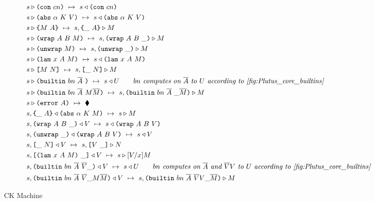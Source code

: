\documentclass[../main.tex]{subfiles}
\begin{document}
\begin{figure*}[t]

    \begin{align*}
        &s \triangleright \texttt{(} \texttt{con} ~ cn \texttt{)} ~\mapsto~ s \triangleleft \texttt{(} \texttt{con} ~ cn \texttt{)}\\
        &s \triangleright \texttt{(} \texttt{abs} ~ \alpha ~ K ~ V \texttt{)} ~\mapsto~ s \triangleleft \texttt{(} \texttt{abs} ~ \alpha ~ K ~ V \texttt{)}\\
        &s \triangleright \texttt{\{}M ~ A\texttt{\}} ~\mapsto~ s, \texttt{\{}\_ ~ A\texttt{\}} \triangleright M\\
        &s \triangleright \texttt{(} \texttt{wrap} ~ A ~ B ~ M \texttt{)} ~\mapsto~ s, \texttt{(} \texttt{wrap} ~ A ~ B ~ \_ \texttt{)} \triangleright M\\
        &s \triangleright \texttt{(} \texttt{unwrap} ~ M \texttt{)} ~\mapsto~ s, \texttt{(} \texttt{unwrap} ~ \_ \texttt{)}{} \triangleright M\\
        &s \triangleright \texttt{(} \texttt{lam} ~ x ~ A ~ M \texttt{)} ~\mapsto~ s \triangleleft \texttt{(} \texttt{lam} ~ x ~ A ~ M \texttt{)}\\
        &s \triangleright \texttt{[} M ~ N \texttt{]} ~\mapsto~ s, \texttt{[} \_ ~ N \texttt{]} \triangleright M\\
        &s \triangleright \texttt{(} \texttt{builtin} ~ bn ~ \overline{A} ~  \texttt{)} ~\mapsto~ s \triangleleft U \qquad \textit{$bn$ computes on $\overline{A}$ to $U$ according to \ref{fig:Plutus_core_builtins}}\\
        &s \triangleright \texttt{(} \texttt{builtin} ~ bn ~ \overline{A} ~ M \overline{M} \texttt{)} ~\mapsto~ s, \texttt{(} \texttt{builtin} ~ bn ~ \overline{A} ~  \_ \overline{M} \texttt{)} \triangleright M\\
        &s \triangleright \texttt{(} \texttt{error} ~ A \texttt{)} ~\mapsto~ \blacklozenge{}\\
        &s, \texttt{\{}\_ ~ A\texttt{\}} \triangleleft \texttt{(} \texttt{abs} ~ \alpha ~ K ~ M \texttt{)} ~\mapsto~ s \triangleright M\\
        &s, \texttt{(} \texttt{wrap} ~ A ~ B ~ \_ \texttt{)} \triangleleft V ~\mapsto~ s \triangleleft \texttt{(} \texttt{wrap} ~ A ~ B ~ V \texttt{)}\\
        &s, \texttt{(} \texttt{unwrap} ~ \_ \texttt{)}{} \triangleleft \texttt{(} \texttt{wrap} ~ A ~ B ~ V \texttt{)} ~\mapsto~ s \triangleleft V\\
        &s, \texttt{[} \_ ~ N \texttt{]} \triangleleft V ~\mapsto~ s, \texttt{[} V ~ \_ \texttt{]} \triangleright N\\
        &s, \texttt{[} \texttt{(} \texttt{lam} ~ x ~ A ~ M \texttt{)} ~ \_ \texttt{]} \triangleleft V ~\mapsto~ s \triangleright [V/x]M\\
        &s, \texttt{(} \texttt{builtin} ~ bn ~ \overline{A} ~ \overline{V} \_  \texttt{)} \triangleleft V ~\mapsto~ s \triangleleft U \qquad \textit{$bn$ computes on $\overline{A}$ and $\overline{V}V$ to $U$ according to \ref{fig:Plutus_core_builtins}}\\
        &s, \texttt{(} \texttt{builtin} ~ bn ~ \overline{A} ~ \overline{V} \_ M \overline{M} \texttt{)} \triangleleft V ~\mapsto~ s, \texttt{(} \texttt{builtin} ~ bn ~ \overline{A} ~ \overline{V} V \_ \overline{M} \texttt{)} \triangleright M\\
    \end{align*}

    \caption{CK Machine}
    \label{fig:Plutus_core_ck_machine}
\end{figure*}
\end{document}
